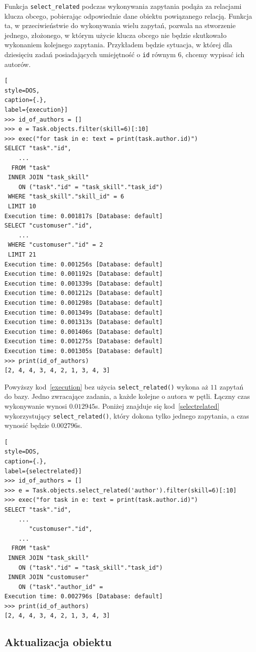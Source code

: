 \documentclass[oneside,polski,logo,indent]{amuthesis}
\begin{document}
Funkcja \texttt{select\_related} podczas wykonywania zapytania podąża za relacjami klucza obcego, pobierając odpowiednie dane obiektu powiązanego relacją.
Funkcja ta, w przeciwieństwie do wykonywania wielu zapytań, pozwala na stworzenie jednego, złożonego, w którym użycie klucza obcego nie będzie skutkowało wykonaniem kolejnego zapytania. Przykładem będzie sytuacja, w której dla dziesięciu zadań posiadających umiejętność o \texttt{id} równym 6, chcemy wypisać ich autorów.
\begin{lstlisting}[
style=DOS,
caption={.},
label={execution}]
>>> id_of_authors = []
>>> e = Task.objects.filter(skill=6)[:10]
>>> exec("for task in e: text = print(task.author.id)")
SELECT "task"."id",
	...
  FROM "task"
 INNER JOIN "task_skill"
    ON ("task"."id" = "task_skill"."task_id")
 WHERE "task_skill"."skill_id" = 6
 LIMIT 10
Execution time: 0.001817s [Database: default]
SELECT "customuser"."id",
	...
 WHERE "customuser"."id" = 2
 LIMIT 21
Execution time: 0.001256s [Database: default]
Execution time: 0.001192s [Database: default]
Execution time: 0.001339s [Database: default]
Execution time: 0.001212s [Database: default]
Execution time: 0.001298s [Database: default]
Execution time: 0.001349s [Database: default]
Execution time: 0.001313s [Database: default]
Execution time: 0.001406s [Database: default]
Execution time: 0.001275s [Database: default]
Execution time: 0.001305s [Database: default]
>>> print(id_of_authors)
[2, 4, 4, 3, 4, 2, 1, 3, 4, 3]
\end{lstlisting}
Powyższy kod~\ref{execution} bez użycia \texttt{select\_related()} wykona aż $11$ zapytań do bazy. Jedno zwracające zadania, a każde kolejne o autora w pętli. Łączny czas wykonywanie wynosi $0.012945$s. Poniżej znajduje się kod~\ref{selectrelated} wykorzystujący \texttt{select\_related()}, który dokona tylko jednego zapytania, a czas wynosić będzie $0.002796$s.
\begin{lstlisting}[
style=DOS,
caption={.},
label={selectrelated}]
>>> id_of_authors = []
>>> e = Task.objects.select_related('author').filter(skill=6)[:10]
>>> exec("for task in e: text = print(task.author.id)")
SELECT "task"."id",
	...
       "customuser"."id",
	...
  FROM "task"
 INNER JOIN "task_skill"
    ON ("task"."id" = "task_skill"."task_id")
 INNER JOIN "customuser"
    ON ("task"."author_id" =
Execution time: 0.002796s [Database: default]
>>> print(id_of_authors)
[2, 4, 4, 3, 4, 2, 1, 3, 4, 3]
\end{lstlisting}

\begin{center}
\subsection{Aktualizacja obiektu}
\end{center}
\end{document}
